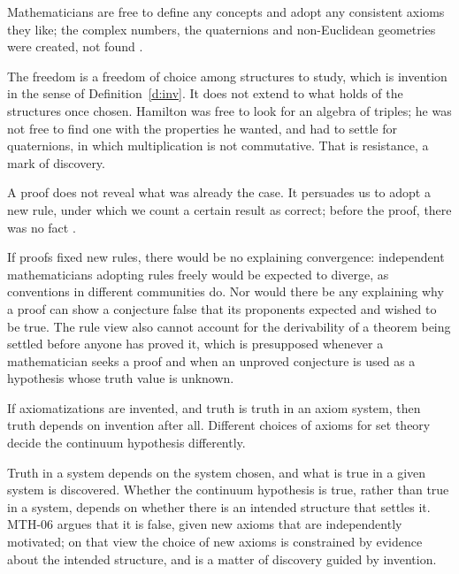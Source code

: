 \documentclass{situationist-preprint}
\begin{document}
\begin{objection}[Freedom]
Mathematicians are free to define any concepts and adopt any consistent axioms they like; the complex numbers, the quaternions and non-Euclidean geometries were created, not found \citep{Cantor1883,Dedekind1888}.
\end{objection}

\begin{reply}
The freedom is a freedom of choice among structures to study, which is invention in the sense of Definition~\ref{d:inv}. It does not extend to what holds of the structures once chosen. Hamilton was free to look for an algebra of triples; he was not free to find one with the properties he wanted, and had to settle for quaternions, in which multiplication is not commutative. That is resistance, a mark of discovery.
\end{reply}

\begin{objection}[Rules]
A proof does not reveal what was already the case. It persuades us to adopt a new rule, under which we count a certain result as correct; before the proof, there was no fact \citep{Wittgenstein1956}.
\end{objection}

\begin{reply}
If proofs fixed new rules, there would be no explaining convergence: independent mathematicians adopting rules freely would be expected to diverge, as conventions in different communities do. Nor would there be any explaining why a proof can show a conjecture false that its proponents expected and wished to be true. The rule view also cannot account for the derivability of a theorem being settled before anyone has proved it, which is presupposed whenever a mathematician seeks a proof and when an unproved conjecture is used as a hypothesis whose truth value is unknown.
\end{reply}

\begin{objection}
If axiomatizations are invented, and truth is truth in an axiom system, then truth depends on invention after all. Different choices of axioms for set theory decide the continuum hypothesis differently.
\end{objection}

\begin{reply}
Truth in a system depends on the system chosen, and what is true in a given system is discovered. Whether the continuum hypothesis is true, rather than true in a system, depends on whether there is an intended structure that settles it. MTH-06 argues that it is false, given new axioms that are independently motivated; on that view the choice of new axioms is constrained by evidence about the intended structure, and is a matter of discovery guided by invention.
\end{reply}
\end{document}
